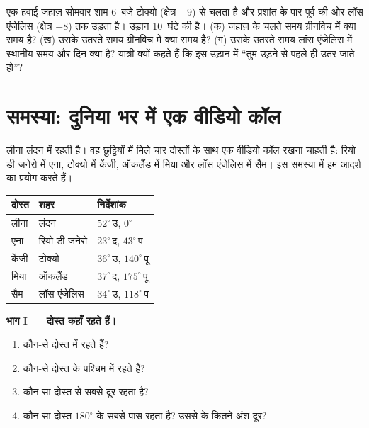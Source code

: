 \begin{exercise}[$\star\star\star$]\label{exo:g6:latitude-longitude:12}
एक हवाई जहाज़ सोमवार शाम 6~बजे टोक्यो (क्षेत्र $+9$) से चलता है और प्रशांत के पार पूर्व
की ओर लॉस एंजेलिस (क्षेत्र $-8$) तक उड़ता है। उड़ान 10~घंटे की है। (क) जहाज़ के
चलते समय ग्रीनविच में क्या समय है? (ख) उसके उतरते समय
ग्रीनविच में क्या समय है? (ग) उसके उतरते समय लॉस
एंजेलिस में स्थानीय समय और दिन क्या है? यात्री क्यों कहते हैं कि इस उड़ान में ``तुम
उड़ने से पहले ही उतर जाते हो''?
\end{exercise}

\section{समस्या: दुनिया भर में एक वीडियो कॉल}

\begin{problem}
\label{pb:g6:latitude-longitude:1}
लीना लंदन में रहती है। वह छुट्टियों में मिले चार दोस्तों के साथ एक वीडियो कॉल रखना
चाहती है: रियो डी जनेरो में एना, टोक्यो में केंजी, ऑकलैंड में मिया
और लॉस एंजेलिस में सैम। इस समस्या में हम आदर्श  का प्रयोग करते हैं।

\begin{center}
\small
\begin{tabular}{lll}
\hline
दोस्त & शहर & निर्देशांक\\
\hline
लीना & लंदन & $52^\circ$\,उ, $0^\circ$\\
एना & रियो डी जनेरो & $23^\circ$\,द, $43^\circ$\,प\\
केंजी & टोक्यो & $36^\circ$\,उ, $140^\circ$\,पू\\
मिया & ऑकलैंड & $37^\circ$\,द, $175^\circ$\,पू\\
सैम & लॉस एंजेलिस & $34^\circ$\,उ, $118^\circ$\,प\\
\hline
\end{tabular}
\end{center}

\medskip
\noindent\textbf{भाग I --- दोस्त कहाँ रहते हैं।}
\begin{enumerate}
  \item कौन-से दोस्त  में रहते हैं?
  \item कौन-से दोस्त  के पश्चिम में रहते हैं?
  \item कौन-सा दोस्त  से सबसे दूर रहता है?
  \item कौन-सा दोस्त $180^\circ$  के सबसे पास रहता है? उससे  के
        कितने अंश दूर?
\end{enumerate}


\end{problem}

